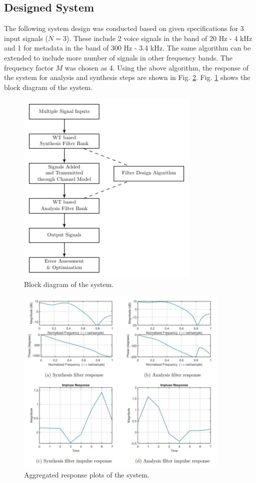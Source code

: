 \documentclass[conference]{IEEEtran}
\begin{document}
\subsection{Designed System}
The following system design was conducted based on given specifications for 3  input signals ($N = 3$). These include 2 voice signals in the band of 20 Hz - 4 kHz and 1 for metadata in the band of 300 Hz - 3.4 kHz. The same algorithm can be extended to include more number of signals in other frequency bands. The frequency factor $M$ was chosen as 4. Using the above algorithm, the response of the system for analysis and synthesis steps are shown in Fig. \ref{agg}. Fig. \ref{fig:block} shows the block diagram of the system.

\begin{figure}
    \centering
    \includegraphics[width=8.75cm]{Block_diagram.pdf}
    \caption{Block diagram of the system.}
    \label{fig:block}
\end{figure}


\begin{figure}[htpb]
\centering
\includegraphics[width = 10.2cm]{agg_response_v2.jpg}
\caption{Aggregated response plots of the system.}
\label{agg}
\end{figure}
\end{document}
